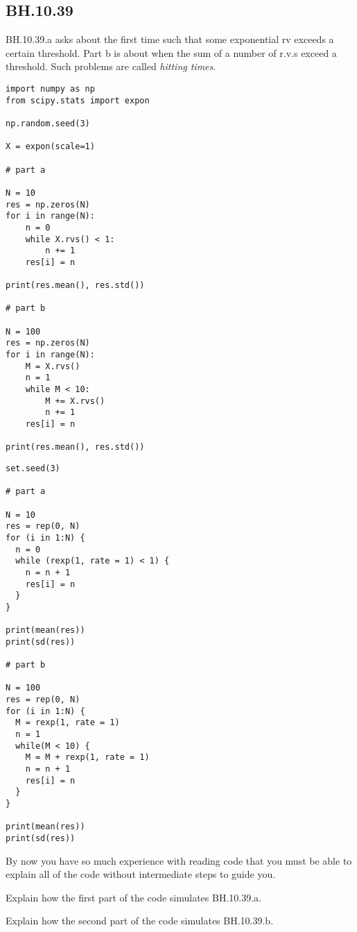 

\subsection{BH.10.39}

BH.10.39.a asks about the first time such that some exponential rv exceeds a certain threshold.
Part b is about when the sum of a number of r.v.s exceed a threshold.
Such problems are called \emph{hitting times}.

\begin{verbatim}
import numpy as np
from scipy.stats import expon

np.random.seed(3)

X = expon(scale=1)

# part a

N = 10
res = np.zeros(N)
for i in range(N):
    n = 0
    while X.rvs() < 1:
        n += 1
    res[i] = n

print(res.mean(), res.std())

# part b

N = 100
res = np.zeros(N)
for i in range(N):
    M = X.rvs()
    n = 1
    while M < 10:
        M += X.rvs()
        n += 1
    res[i] = n

print(res.mean(), res.std())
\end{verbatim}

\begin{verbatim}
set.seed(3)

# part a

N = 10
res = rep(0, N)
for (i in 1:N) {
  n = 0
  while (rexp(1, rate = 1) < 1) {
    n = n + 1
    res[i] = n
  }
}

print(mean(res))
print(sd(res))

# part b

N = 100
res = rep(0, N)
for (i in 1:N) {
  M = rexp(1, rate = 1)
  n = 1
  while(M < 10) {
    M = M + rexp(1, rate = 1)
    n = n + 1
    res[i] = n
  }
}

print(mean(res))
print(sd(res))
\end{verbatim}


By now you have so much experience with reading code that you must be able to explain all of the code without intermediate steps to guide you.
\begin{exercise}
Explain how the first part of the code simulates BH.10.39.a.
\end{exercise}

\begin{exercise}
Explain how the second part of the code simulates BH.10.39.b.
\end{exercise}

